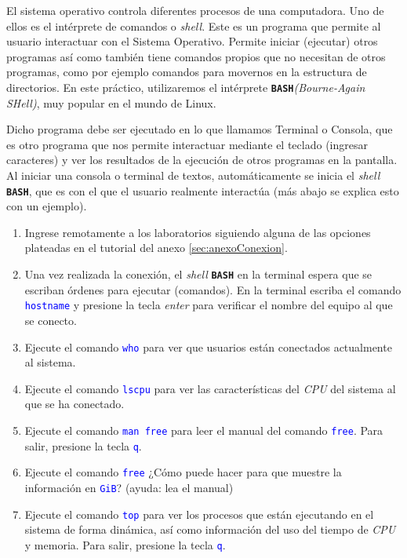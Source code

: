 \documentclass[12pt]{article}
\newcommand{\cw}[1]{\texttt{\textcolor{blue}{#1}}}
\newcommand{\bash}{\textbf{\texttt{BASH}}}
\begin{document}
El sistema operativo controla diferentes procesos de una computadora. Uno de
ellos es el intérprete de comandos o \emph{shell}. Este es un programa que
permite al usuario interactuar con el Sistema Operativo. Permite iniciar
(ejecutar) otros programas así como también tiene comandos propios que no
necesitan de otros programas, como por ejemplo comandos para movernos en la
estructura de directorios. En este práctico, utilizaremos el intérprete
\bash\emph{(Bourne-Again SHell)}, muy popular en el mundo de Linux.

Dicho programa debe ser ejecutado en lo que llamamos Terminal o Consola, que
es otro programa que nos permite interactuar mediante el teclado (ingresar
caracteres) y ver los resultados de la ejecución de otros programas en la
pantalla. Al iniciar una consola o terminal de textos, automáticamente se
inicia el \emph{shell} \bash, que es con el que el usuario realmente
interactúa (más abajo se explica esto con un ejemplo).

\begin{enumerate}

    \item Ingrese remotamente a los laboratorios siguiendo alguna de las
        opciones plateadas en el tutorial del anexo \ref{sec:anexoConexion}.
        
    \item Una vez realizada la conexión, el \emph{shell} \bash{} en la
        terminal espera que se escriban órdenes para ejecutar (comandos). En
        la terminal escriba el comando \cw{hostname} y presione la tecla
        \emph{enter} para verificar el nombre del equipo al que se conecto.

    \item Ejecute el comando \cw{who} para ver que usuarios están conectados
        actualmente al sistema.

    \item Ejecute el comando \cw{lscpu} para ver las características del
        \emph{CPU} del sistema al que se ha conectado.

    \item Ejecute el comando \cw{man free} para leer el manual del comando
        \cw{free}. Para salir, presione la tecla \cw{q}.

    \item Ejecute el comando \cw{free} ¿Cómo puede hacer para que muestre la
        información en \cw{GiB}? (ayuda: lea el manual)

    \item Ejecute el comando \cw{top} para ver los procesos que están
        ejecutando en el sistema de forma dinámica, así como información del
        uso del tiempo de \emph{CPU} y memoria. Para salir, presione la tecla
        \cw{q}.

\end{enumerate}
\end{document}
